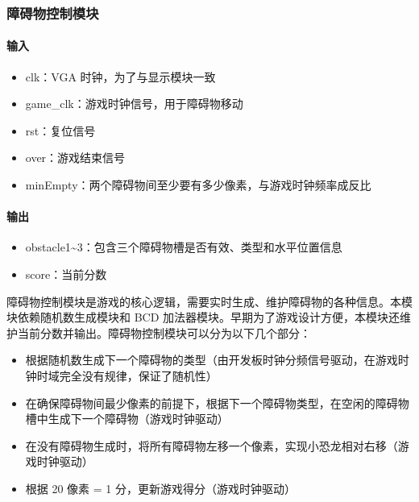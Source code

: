 \documentclass[hyperref,UTF8,12pt,a4paper]{ctexart}
\providecommand{\tightlist}{%
  \setlength{\itemsep}{0pt}\setlength{\parskip}{0pt}}
\begin{document}
\hypertarget{ux969cux788dux7269ux63a7ux5236ux6a21ux5757}{%
\subsubsection{障碍物控制模块}\label{ux969cux788dux7269ux63a7ux5236ux6a21ux5757}}

\hypertarget{ux8f93ux5165-2}{%
\paragraph{输入}\label{ux8f93ux5165-2}}

\begin{itemize}
\tightlist
\item
  clk：VGA 时钟，为了与显示模块一致
\item
  game\_clk：游戏时钟信号，用于障碍物移动
\item
  rst：复位信号
\item
  over：游戏结束信号
\item
  minEmpty：两个障碍物间至少要有多少像素，与游戏时钟频率成反比
\end{itemize}

\hypertarget{ux8f93ux51fa-2}{%
\paragraph{输出}\label{ux8f93ux51fa-2}}

\begin{itemize}
\tightlist
\item
  obstacle1\textasciitilde3：包含三个障碍物槽是否有效、类型和水平位置信息
\item
  score：当前分数
\end{itemize}

障碍物控制模块是游戏的核心逻辑，需要实时生成、维护障碍物的各种信息。本模块依赖随机数生成模块和
BCD
加法器模块。早期为了游戏设计方便，本模块还维护当前分数并输出。障碍物控制模块可以分为以下几个部分：

\begin{itemize}
\tightlist
\item
  根据随机数生成下一个障碍物的类型（由开发板时钟分频信号驱动，在游戏时钟时域完全没有规律，保证了随机性）
\item
  在确保障碍物间最少像素的前提下，根据下一个障碍物类型，在空闲的障碍物槽中生成下一个障碍物（游戏时钟驱动）
\item
  在没有障碍物生成时，将所有障碍物左移一个像素，实现小恐龙相对右移（游戏时钟驱动）
\item
  根据 20 像素 = 1 分，更新游戏得分（游戏时钟驱动）
\end{itemize}
\end{document}
